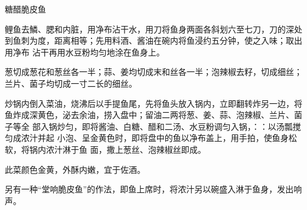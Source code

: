 \begin{recipe}{糖醋脆皮鱼}

\ingredients


\preparation

\step 鲤鱼去鱗、腮和内脏，用净布沾干水，用刀将鱼身两面各斜划六至七刀，刀的深处
到鱼刺为度，距离相等；先用料酒、酱油在碗内将鱼浸约五分钟，使之入味；取出用净布
沾干再用水豆粉均匀地涂在鱼身上。

\step 葱切成葱花和葱丝各一半；蒜、姜均切成末和丝各一半；泡辣椒去籽，切成细丝；
兰片、菌子均切成一寸二长的细丝。

\step 炒锅内倒入菜油，烧沸后以手提鱼尾，先将鱼头放入锅内，立即翻转炸另一边，将
鱼炸成深黄色，泌去余油，捞入盘中；留油二两将葱、姜、蒜、泡辣椒、兰片、菌子等全
部入锅炒匀，即将酱油、白糖、醋和二汤、水豆粉调匀入锅，：：以汤瓢搅匀成浓汁并起
小泡、呈金黄色时，即将盘中的鱼以净布盖上，用手拍，使鱼身松软，将锅内浓汁淋于鱼
面，撒上葱丝、泡辣椒丝即成。

\features

此菜颜色金黄，外酥内嫩，宜于佐酒。

另有一种“堂响脆皮鱼”的作法，即鱼上席时，将浓汁另以碗盛入淋于鱼身，发出响声。

\end{recipe}

